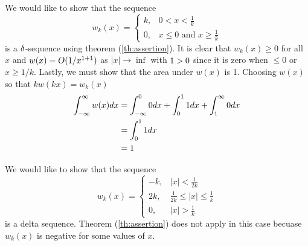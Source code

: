 \begin{example}
    We would like to show that the sequence
    \begin{equation*}
        w_k(x) = \begin{cases}
            k, &  0<x<\frac{1}{k}\\
            0, &x\leq 0 \text{ and } x \geq \frac{1}{k}
        \end{cases}
    \end{equation*}
    is a \(\delta\)-sequence using theorem (\ref{th:assertion}). It is clear that \(w_k(x)\geq 0\)  for all \(x\) and \(w(x)=O(1/x^{1+1})\) as \(|x| \rightarrow \inf\) with \(1>0\) since it is zero when \(\leq 0\) or \(x \geq 1/k\). Lastly, we must show that the area under \(w(x)\) is 1. Choosing \(w(x)\) so that \(kw(kx)=w_k(x)\)
    \begin{equation}
        \begin{split}
            \int_{-\infty}^{\infty} w(x) dx &= \int_{-\infty}^{0} 0 dx +\int_0^1 1 dx + \int_{1}^{\infty} 0 dx\\
            &=\int_0^1 1 dx\\
            &=1
        \end{split}
    \end{equation}
\end{example}

\begin{example}
    We would like to show that the sequence
    \begin{equation}
        w_k(x) = \begin{cases}
            -k, &|x|<\frac{1}{2k}\\
            2k, &\frac{1}{2k} \leq |x| \leq \frac{1}{k}\\
            0, &|x|> \frac{1}{k} 
        \end{cases}
    \end{equation}
    is a delta sequence. Theorem (\ref{th:assertion}) does not apply in this case becuase \(w_k(x)\) is negative for some values of \(x\). %
\end{example}